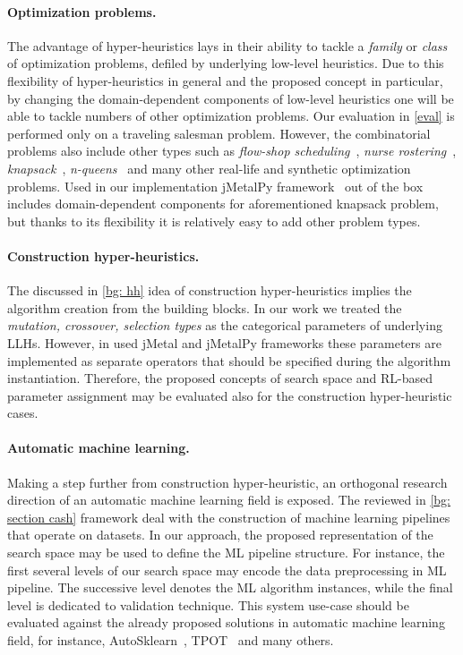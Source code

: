 \paragraph{Optimization problems.} The advantage of hyper-heuristics lays in their ability to tackle a \emph{family} or \emph{class} of optimization problems, defiled by underlying low-level heuristics. Due to this flexibility of hyper-heuristics in general and the proposed concept in particular, by changing the domain-dependent components of low-level heuristics one will be able to tackle numbers of other optimization problems. Our evaluation in \cref{eval} is performed only on a traveling salesman problem. However, the combinatorial problems also include other types such as \emph{flow-shop scheduling}~\cite{gupta2006flowshop}, \emph{nurse rostering}~\cite{cheang2003nurse}, \emph{knapsack}~\cite{ross1989stochastic}, \emph{n-queens}~\cite{rivin1994n} and many other real-life and synthetic optimization problems. Used in our implementation jMetalPy framework~\cite{benitez2019jmetalpy} out of the box includes domain-dependent components for aforementioned knapsack problem, but thanks to its flexibility it is relatively easy to add other problem types.

\paragraph{Construction hyper-heuristics.} The discussed in \cref{bg: hh} idea of construction hyper-heuristics implies the algorithm creation from the building blocks. In our work we treated the \emph{mutation, crossover, selection types} as the categorical parameters of underlying LLHs. However, in used jMetal and jMetalPy frameworks these parameters are implemented as separate operators that should be specified during the algorithm instantiation. Therefore, the proposed concepts of search space and RL-based parameter assignment may be evaluated also for the construction hyper-heuristic cases.

\paragraph{Automatic machine learning.} Making a step further from construction hyper-heuristic, an orthogonal research direction of an automatic machine learning field is exposed. The reviewed in \cref{bg: section cash} framework deal with the construction of machine learning pipelines that operate on datasets. In our approach, the proposed representation of the search space may be used to define the ML pipeline structure. For instance, the first several levels of our search space may encode the data preprocessing in ML pipeline. The successive level denotes the ML algorithm instances, while the final level is dedicated to validation technique. This system use-case should be evaluated against the already proposed solutions in automatic machine learning field, for instance, AutoSklearn~\cite{feurer2015efficient}, TPOT~\cite{olson2019tpot} and many others.


